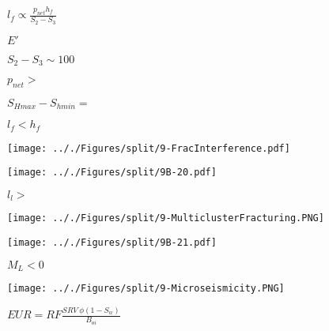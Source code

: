 \documentclass[onecolumn,11pt]{report}
\def\lthtmlcheckvsize{\ifdim\ht\sizebox<\vsize 
  \ifdim\wd\sizebox<\hsize\expandafter\hfill\fi \expandafter\vfill
  \else\expandafter\vss\fi}%
\begin{document}
{\newpage\clearpage
{}%
$\displaystyle l_f \propto \frac{p_{net} h_f}{S_2-S_3}$%
\lthtmlindisplaymathZ
\lthtmlcheckvsize\clearpage}

{\newpage\clearpage
{}%
$ E'$%
\lthtmlindisplaymathZ
\lthtmlcheckvsize\clearpage}

{\newpage\clearpage
{}%
$ S_2-S_3 \sim 100$%
\lthtmlindisplaymathZ
\lthtmlcheckvsize\clearpage}

{\newpage\clearpage
{}%
$ p_{net} >$%
\lthtmlindisplaymathZ
\lthtmlcheckvsize\clearpage}

{\newpage\clearpage
{}%
$ S_{Hmax}-S_{hmin} =$%
\lthtmlindisplaymathZ
\lthtmlcheckvsize\clearpage}

{\newpage\clearpage
{}%
$ l_f < h_f$%
\lthtmlindisplaymathZ
\lthtmlcheckvsize\clearpage}

{\newpage\clearpage
{}%
\texttt{[image: .././Figures/split/9-FracInterference.pdf]}%
\lthtmlpictureZ
\lthtmlcheckvsize\clearpage}

{\newpage\clearpage
{}%
\texttt{[image: .././Figures/split/9B-20.pdf]}%
\lthtmlpictureZ
\lthtmlcheckvsize\clearpage}

{\newpage\clearpage
{}%
$ l_l >$%
\lthtmlindisplaymathZ
\lthtmlcheckvsize\clearpage}

{\newpage\clearpage
{}%
\texttt{[image: .././Figures/split/9-MulticlusterFracturing.PNG]}%
\lthtmlpictureZ
\lthtmlcheckvsize\clearpage}

{\newpage\clearpage
{}%
\texttt{[image: .././Figures/split/9B-21.pdf]}%
\lthtmlpictureZ
\lthtmlcheckvsize\clearpage}

{\newpage\clearpage
{}%
$ M_L<0$%
\lthtmlindisplaymathZ
\lthtmlcheckvsize\clearpage}

{\newpage\clearpage
{}%
\texttt{[image: .././Figures/split/9-Microseismicity.PNG]}%
\lthtmlpictureZ
\lthtmlcheckvsize\clearpage}

{\newpage\clearpage
{}%
$\displaystyle EUR = RF \frac{ SRV \: \phi (1-S_w)} {B_{oi}}$%
\lthtmlindisplaymathZ
\lthtmlcheckvsize\clearpage}
\end{document}
